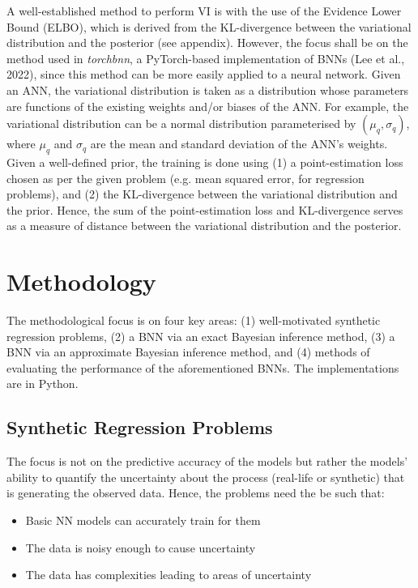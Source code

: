 \documentclass[conference]{IEEEtran}
\begin{document}
A well-established method to perform VI is with the use of the Evidence Lower Bound (ELBO), which is derived from the KL-divergence between the variational distribution and the posterior (see appendix). However, the focus shall be on the method used in \textit{torchbnn}, a PyTorch-based implementation of BNNs (Lee et al., 2022), since this method can be more easily applied to a neural network. Given an ANN, the variational distribution is taken as a distribution whose parameters are functions of the existing weights and/or biases of the ANN. For example, the variational distribution can be a normal distribution parameterised by $(\mu_q, \sigma_q)$, where $\mu_q$ and $\sigma_q$ are the mean and standard deviation of the ANN's weights. Given a well-defined prior, the training is done using (1) a point-estimation loss chosen as per the given problem (e.g. mean squared error, for regression problems), and (2) the KL-divergence between the variational distribution and the prior. Hence, the sum of the point-estimation loss and KL-divergence serves as a measure of distance between the variational distribution and the posterior.

\section{Methodology}
The methodological focus is on four key areas: (1) well-motivated synthetic regression problems, (2) a BNN via an exact Bayesian inference method, (3) a BNN via an approximate Bayesian inference method, and (4) methods of evaluating the performance of the aforementioned BNNs. The implementations are in Python.

\subsection{Synthetic Regression Problems}
The focus is not on the predictive accuracy of the models but rather the models' ability to quantify the uncertainty about the process (real-life or synthetic) that is generating the observed data. Hence, the problems need the be such that:\\

\begin{itemize}
    \item Basic NN models can accurately train for them
    \item The data is noisy enough to cause uncertainty
    \item The data has complexities leading to areas of uncertainty\\
\end{itemize}
\end{document}
